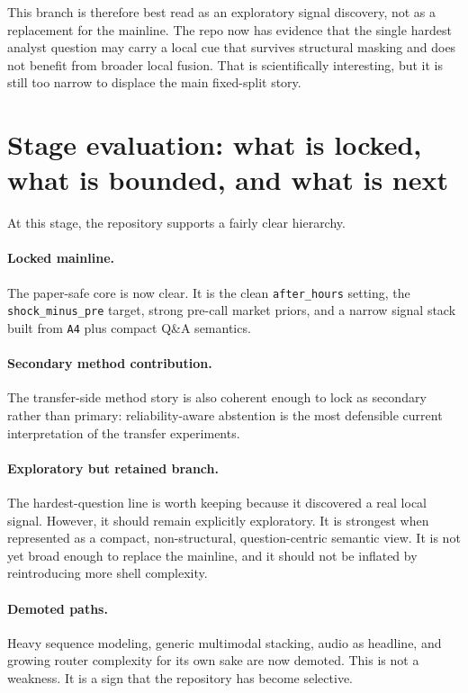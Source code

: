 \documentclass[acmsmall,screen,nonacm]{acmart}
\begin{document}
This branch is therefore best read as an exploratory signal discovery, not as a replacement for the mainline. The repo now has evidence that the single hardest analyst question may carry a local cue that survives structural masking and does not benefit from broader local fusion. That is scientifically interesting, but it is still too narrow to displace the main fixed-split story.

\section{Stage evaluation: what is locked, what is bounded, and what is next}
At this stage, the repository supports a fairly clear hierarchy.

\paragraph{Locked mainline.}
The paper-safe core is now clear. It is the clean \texttt{after\_hours} setting, the \texttt{shock\_minus\_pre} target, strong pre-call market priors, and a narrow signal stack built from \texttt{A4} plus compact Q\&A semantics.

\paragraph{Secondary method contribution.}
The transfer-side method story is also coherent enough to lock as secondary rather than primary: reliability-aware abstention is the most defensible current interpretation of the transfer experiments.

\paragraph{Exploratory but retained branch.}
The hardest-question line is worth keeping because it discovered a real local signal. However, it should remain explicitly exploratory. It is strongest when represented as a compact, non-structural, question-centric semantic view. It is not yet broad enough to replace the mainline, and it should not be inflated by reintroducing more shell complexity.

\paragraph{Demoted paths.}
Heavy sequence modeling, generic multimodal stacking, audio as headline, and growing router complexity for its own sake are now demoted. This is not a weakness. It is a sign that the repository has become selective.
\end{document}
